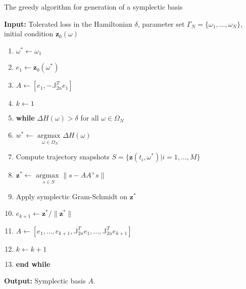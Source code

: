 \begin{algorithm} 
\caption{The greedy algorithm for generation of a symplectic basis} \label{alg:SyMo:3}
{\bf Input:} Tolerated loss in the Hamiltonian $\delta$, parameter set $\Gamma_N = \{\omega_1,\dots,\omega_N\}$, initial condition $\mathbf z_0(\omega)$
\begin{enumerate}
\item $\omega^* \leftarrow \omega_1$
\item $e_1 \leftarrow \mathbf z_0(\omega^*)$
\item $A \leftarrow [e_1,-\mathbb J^T_{2n}e_1]$
\item $k \leftarrow 1$
\item \textbf{while} $\Delta H(\omega) > \delta$ for all $\omega \in \Omega_N$
\item \hspace{0.5cm} $w^* \leftarrow$ $\underset{\omega\in \Omega_N}{\text{argmax }}\Delta H(\omega)$
\item \hspace{0.5cm} Compute trajectory snapshots $S=\{ \mathbf z(t_i,\omega^*) | i = 1,\dots,M \}$
\item \hspace{0.5cm} $\mathbf z^* \leftarrow$ $\underset{s\in S}{\text{argmax }} \| s - AA^+s \|$
\item \hspace{0.5cm} Apply symplectic Gram-Schmidt on $\mathbf z^*$
\item \hspace{0.5cm} $e_{k+1} \leftarrow \mathbf z^*/ \| \mathbf  z^*\|$
\item \hspace{0.5cm} $A \leftarrow [e_1,\dots ,e_{k+1} , \mathbb J^T_{2n}e_1,\dots,\mathbb J^T_{2n}e_{k+1}]$
\item \hspace{0.5cm} $k \leftarrow k+1$
\item \textbf{end while}
\end{enumerate}
\vspace{0.5cm}
{\bf Output:} Symplectic basis $A$.
\end{algorithm}

